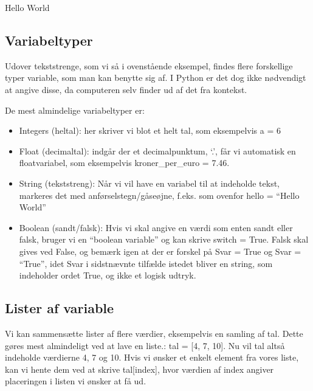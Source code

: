 \documentclass[letterpaper,10pt,english]{jupyterBook}
\begin{document}
\begin{sphinxVerbatim}[commandchars=\\\{\}]
\PYGZsq{}Hello World\PYGZsq{}
\end{sphinxVerbatim}


\subsection{Variabeltyper}
\label{\detokenize{notebooks/Basal_python:variabeltyper}}
Udover tekststrenge, som vi så i ovenstående eksempel, findes flere forskellige typer variable, som man kan benytte sig af. I Python er det dog ikke nødvendigt at angive disse, da computeren selv finder ud af det fra kontekst.

De mest almindelige variabeltyper er:
\begin{itemize}
\item {} 
Integers (heltal): her skriver vi blot et helt tal, som eksempelvis a = 6

\item {} 
Float (decimaltal): indgår der et decimalpunktum, ‘.’, får vi automatisk en float\sphinxhyphen{}variabel, som eksempelvis kroner\_per\_euro = 7.46.

\item {} 
String (tekststreng): Når vi vil have en variabel til at indeholde tekst, markeres det med anførselstegn/gåseøjne, f.eks. som ovenfor hello = “Hello World”

\item {} 
Boolean (sandt/falsk): Hvis vi skal angive en værdi som enten sandt eller falsk, bruger vi en “boolean variable” og kan skrive switch = True. Falsk skal gives ved False, og bemærk igen at der er forskel på Svar = True og Svar = “True”, idet Svar i sidstnævnte tilfælde istedet bliver en string, som indeholder ordet True, og ikke et logisk udtryk.

\end{itemize}


\subsection{Lister af variable}
\label{\detokenize{notebooks/Basal_python:lister-af-variable}}
Vi kan sammensætte lister af flere værdier, eksempelvis en samling af tal. Dette gøres mest almindeligt ved at lave en liste.:
tal = {[}4, 7, 10{]}. Nu vil tal altså indeholde værdierne 4, 7 og 10. Hvis vi ønsker et enkelt element fra vores liste, kan vi hente dem ved at skrive tal{[}index{]}, hvor værdien af index angiver placeringen i listen vi ønsker at få ud.
\end{document}
